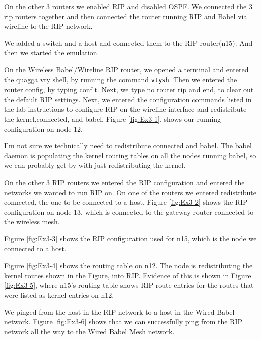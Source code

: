 \documentclass[main.tex]{subfiles}
\begin{document}
\noindent On the other 3 routers we enabled RIP and disabled OSPF.  We connected the 3 rip routers together and then connected the router running RIP and Babel via wireline to the RIP network.

\noindent We added a switch and a host and connected them to the RIP router(n15). And then we started the emulation.

\noindent On the Wireless Babel/Wireline RIP router, we opened a terminal and entered the quagga vty shell, by running the command \texttt{vtysh}.
\noindent Then we entered the router config, by typing conf t.  Next, we type no router rip and end, to clear out the default RIP settings.
\noindent Next, we entered the configuration commands listed in the lab instructions to configure RIP on the wireline interface and redistribute the kernel,connected, and babel.  Figure \ref{fig:Ex3-1}, shows our running configuration on node 12.

\noindent I'm not sure we technically need to redistribute connected and babel.  The babel daemon is populating the kernel routing tables on all the nodes running babel, so we can probably get by with just redistributing the kernel.

\noindent On the other 3 RIP routers we entered the RIP configuration and entered the networks we wanted to run RIP on. On one of the routers we entered redistribute connected, the one to be connected to a host.
Figure \ref{fig:Ex3-2} shows the RIP configuration on node 13, which is connected to the gateway router connected to the wireless mesh.

Figure \ref{fig:Ex3-3} shows the RIP configuration used for n15, which is the node we connected to a host.


\noindent Figure \ref{fig:Ex3-4} shows the routing table on n12.  The node is redistributing the kernel routes shown in the Figure, into RIP.  Evidence of this is shown in Figure \ref{fig:Ex3-5}, where n15's routing table shows RIP route entries for the routes that were listed as kernel entries on n12.


\noindent We pinged from the host in the RIP network to a host in the Wired Babel network.  Figure \ref{fig:Ex3-6} shows that we can successfully ping from the RIP network all the way to the Wired Babel Mesh network.
\end{document}
